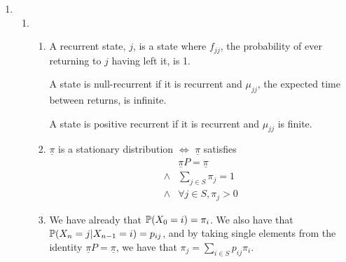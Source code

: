\documentclass{article}
\begin{document}
\begin{enumerate}
\begin{enumerate}
\end{enumerate}
\item 
\begin{enumerate}
\item
\begin{enumerate}
\item
A recurrent state, $j$, is a state where $f_{jj}$, the probability of ever returning to $j$ having left it, is 1.

A state is null-recurrent if it is recurrent and $\mu_{jj}$, the expected time between returns, is infinite.

A state is positive recurrent if it is recurrent and $\mu_{jj}$ is finite.

\item
$\underline{\pi}$ is a stationary distribution $\iff$ $\underline{\pi}$ satisfies
\begin{align*}
&\underline{\pi}P = \underline{\pi}\\
\wedge &\sum_{j \in S} \pi_j = 1\\
\wedge & \forall j \in S, \pi_j > 0
\end{align*}
\item 
We have already that $\mathbb{P} (X_0 = i) = \pi_i$.  We also have that $\mathbb{P} (X_n = j | X_{n-1} = i) = p_{ij}$, and by taking single elements from the identity $\underline{\pi}P = \underline{\pi}$, we have that $\pi_j = \sum\limits_{i\in S}p_{ij}\pi_i$.


\end{enumerate}
\end{enumerate}
\end{enumerate}
\end{document}
